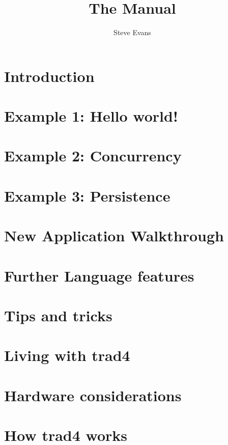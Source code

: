 \documentclass{report}
\begin{document}
\title{The Manual}
\author{Steve Evans}
\maketitle

\chapter{Introduction}

\chapter{Example 1: Hello world!}

\chapter{Example 2: Concurrency}

\chapter{Example 3: Persistence}

\chapter{New Application Walkthrough}

\chapter{Further Language features}

\chapter{Tips and tricks}

\chapter{Living with trad4}

\chapter{Hardware considerations}

\appendix

\chapter{How trad4 works}
\end{document}
